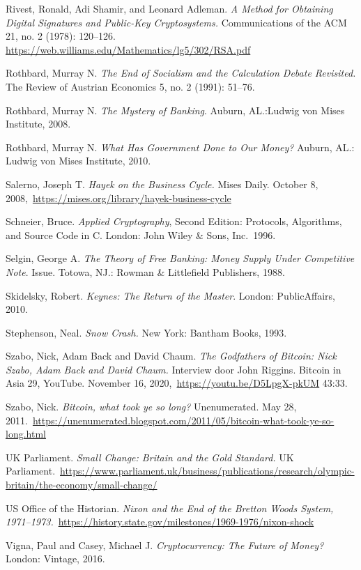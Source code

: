 \documentclass[
  a5paper,
  smalldemyvopaper,11pt,twoside,onecolumn,openright,extrafontsizes,
hidelinks]{memoir}
\begin{document}
Rivest, Ronald, Adi Shamir, and Leonard Adleman. \emph{A Method for
Obtaining Digital Signatures and Public-Key Cryptosystems.}
Communications of the ACM 21, no. 2 (1978): 120--126.
\url{https://web.williams.edu/Mathematics/lg5/302/RSA.pdf}

Rothbard, Murray N. \emph{The End of Socialism and the Calculation
Debate Revisited.} The Review of Austrian Economics 5, no. 2 (1991):
51--76.

Rothbard, Murray N. \emph{The Mystery of Banking}. Auburn, AL.:Ludwig
von Mises Institute, 2008.

Rothbard, Murray N. \emph{What Has Government Done to Our Money?}
Auburn, AL.: Ludwig von Mises Institute, 2010.

Salerno, Joseph T. \emph{Hayek on the Business Cycle.} Mises Daily.
October 8, 2008,~\url{https://mises.org/library/hayek-business-cycle}

Schneier, Bruce. \emph{Applied Cryptography}, Second Edition: Protocols,
Algorithms, and Source Code in C. London: John Wiley \& Sons, Inc.~1996.

Selgin, George A. \emph{The Theory of Free Banking: Money Supply Under
Competitive Note}. Issue. Totowa, NJ.: Rowman \& Littlefield Publishers,
1988.

Skidelsky, Robert. \emph{Keynes: The Return of the Master}. London:
PublicAffairs, 2010.

Stephenson, Neal. \emph{Snow Crash.} New York: Bantham Books, 1993.

Szabo, Nick, Adam Back and David Chaum. \emph{The Godfathers of Bitcoin:
Nick Szabo, Adam Back and David Chaum.} Interview door John Riggins.
Bitcoin in Asia 29, YouTube. November 16,
2020,~\url{https://youtu.be/D5LpgX-pkUM} 43:33.

Szabo, Nick. \emph{Bitcoin, what took ye so long?} Unenumerated. May 28,
2011.~\url{https://unenumerated.blogspot.com/2011/05/bitcoin-what-took-ye-so-long.html}

UK Parliament. \emph{Small Change: Britain and the Gold Standard.} UK
Parliament.~\url{https://www.parliament.uk/business/publications/research/olympic-britain/the-economy/small-change/}

US Office of the Historian. \emph{Nixon and the End of the Bretton Woods
System,
1971--1973.}~\url{https://history.state.gov/milestones/1969-1976/nixon-shock}

Vigna, Paul and Casey, Michael J. \emph{Cryptocurrency: The Future of
Money?} London: Vintage, 2016.
\end{document}
